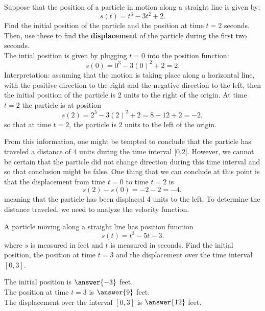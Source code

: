 \documentclass{ximera}
\begin{document}
\begin{example}
Suppose that the position of a particle in motion along a straight line is given by:
\[s(t) = t^3 - 3t^2 + 2.\]
Find the initial position of the particle and the position at time $t = 2$ seconds.
Then, use these to find the \textbf{displacement} of the particle during the first two seconds.\\

The intial position is given by plugging $t=0$ into the position function: 
\[s(0) = 0^3 -3(0)^2 + 2 = 2.\]
Interpretation: assuming that the motion is taking place along a horizontal line,
with the positive direction to the right and the negative direction to the left, then the initial position 
of the particle is 2 units to the right of the origin.
At time $t=2$ the particle is at position
\[s(2) = 2^3 -3(2)^2 + 2 = 8 - 12 + 2 = -2,\]
so that at time $t = 2$, the particle is 2 units to the left of the origin.
\begin{center}
\end{center}

From this information, one might be tempted to conclude that the particle has traveled a distance  of 4 units
during the time interval [0,2].  However, we cannot be certain that the particle did not change direction 
during this time interval and so that conclusion might be false. 
One thing that we can conclude at this point is that the displacement from 
time $t = 0$ to time $t = 2$ is
\[s(2) - s(0) = -2 - 2 = -4,\]
meaning that the particle has been displaced 4 units to the left. To determine the distance traveled, we need to analyze the velocity function.  
\end{example}

\begin{problem}
A particle moving along a straight line has position function
\[s(t) = t^3 - 5t -3.\]
where $s$ is measured in feet and $t$ is measured in seconds.
Find the initial position, the position at time $t = 3$ 
and the displacement over the time interval $[0,3]$.

The initial position is $\answer{-3}$ feet.\\
The position at time $t=3$ is $\answer{9}$ feet.\\
The displacement over the interval $[0,3]$ is $\answer{12}$ feet.\\

\end{problem}
\end{document}
